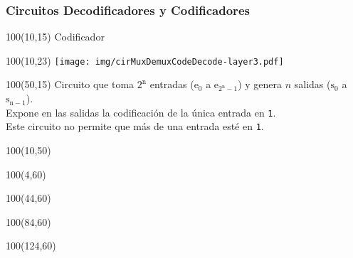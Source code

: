 \documentclass[aspectratio=169]{beamer}
\begin{document}
\begin{frame}[fragile]
    \frametitle{Circuitos Decodificadores y Codificadores}
    \begin{textblock}{100}(10,15) Codificador \end{textblock}
    \begin{textblock}{100}(10,23) \texttt{[image: img/cirMuxDemuxCodeDecode-layer3.pdf]} \end{textblock}
    \begin{textblock}{100}(50,15)
    \small Circuito que toma $\mathrm{2^n}$ entradas ($\mathrm{e_0}$ a $\mathrm{e_{2^n-1}}$) y genera $n$ salidas ($\mathrm{s_0}$ a $\mathrm{s_{n-1}}$).\\
    \bigskip
    Expone en las salidas la codificación de la única entrada en \texttt{1}.\\ Este circuito no permite que más de una entrada esté en \texttt{1}. 
    \end{textblock}
    \begin{textblock}{100}(10,50)   \end{textblock}
    \begin{textblock}{100}(4,60)   \end{textblock}
    \begin{textblock}{100}(44,60)   \end{textblock}
    \begin{textblock}{100}(84,60)   \end{textblock}
    \begin{textblock}{100}(124,60)  \end{textblock}
\end{frame}
\end{document}
